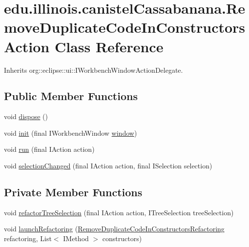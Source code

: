 \hypertarget{classedu_1_1illinois_1_1canistelCassabanana_1_1RemoveDuplicateCodeInConstructorsAction}{
\section{edu.illinois.canistelCassabanana.RemoveDuplicateCodeInConstructorsAction Class Reference}
\label{classedu_1_1illinois_1_1canistelCassabanana_1_1RemoveDuplicateCodeInConstructorsAction}
}


Inherits org::eclipse::ui::IWorkbenchWindowActionDelegate.

\subsection*{Public Member Functions}
\begin{DoxyCompactItemize}
\item 
void \hyperlink{classedu_1_1illinois_1_1canistelCassabanana_1_1RemoveDuplicateCodeInConstructorsAction_aa476e003a3ba5c6308a3ee8ab337e528}{dispose} ()
\item 
void \hyperlink{classedu_1_1illinois_1_1canistelCassabanana_1_1RemoveDuplicateCodeInConstructorsAction_a97ea38a871452b56cae1d6f6b83fa97e}{init} (final IWorkbenchWindow \hyperlink{classedu_1_1illinois_1_1canistelCassabanana_1_1RemoveDuplicateCodeInConstructorsAction_adc9c8660932d820c161ecee669548037}{window})
\item 
void \hyperlink{classedu_1_1illinois_1_1canistelCassabanana_1_1RemoveDuplicateCodeInConstructorsAction_a34cd91d35b5581afbaa84c5d8427b6ad}{run} (final IAction action)
\item 
void \hyperlink{classedu_1_1illinois_1_1canistelCassabanana_1_1RemoveDuplicateCodeInConstructorsAction_a533e80dd41b0fdd06e3c12c4772ff443}{selectionChanged} (final IAction action, final ISelection selection)
\end{DoxyCompactItemize}
\subsection*{Private Member Functions}
\begin{DoxyCompactItemize}
\item 
void \hyperlink{classedu_1_1illinois_1_1canistelCassabanana_1_1RemoveDuplicateCodeInConstructorsAction_af52589bfa5dd7c1a58ee28e0450227aa}{refactorTreeSelection} (final IAction action, ITreeSelection treeSelection)
\item 
void \hyperlink{classedu_1_1illinois_1_1canistelCassabanana_1_1RemoveDuplicateCodeInConstructorsAction_a58b211f8cd5a1701dea892911348d9b1}{launchRefactoring} (\hyperlink{classedu_1_1illinois_1_1canistelCassabanana_1_1RemoveDuplicateCodeInConstructorsRefactoring}{RemoveDuplicateCodeInConstructorsRefactoring} refactoring, List$<$ IMethod $>$ constructors)
\end{DoxyCompactItemize}
